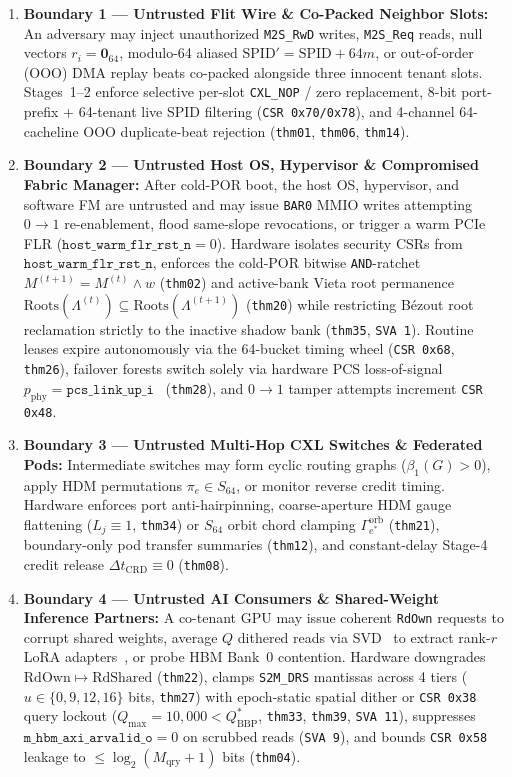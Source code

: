 \documentclass[11pt,letterpaper]{article}
\theoremstyle{spectralthm}
\begin{document}
\begin{enumerate}
  \item \textbf{Boundary 1 --- Untrusted Flit Wire \& Co-Packed Neighbor Slots:} An adversary may inject unauthorized \texttt{M2S\_RwD} writes, \texttt{M2S\_Req} reads, null vectors $r_i = \mathbf{0}_{64}$, modulo-64 aliased $\mathrm{SPID}' = \mathrm{SPID} + 64m$, or out-of-order (OOO) DMA replay beats co-packed alongside three innocent tenant slots. Stages~1--2 enforce selective per-slot \texttt{CXL\_NOP} / zero replacement, 8-bit port-prefix + 64-tenant live SPID filtering (\texttt{CSR 0x70/0x78}), and 4-channel 64-cacheline OOO duplicate-beat rejection (\texttt{thm01}, \texttt{thm06}, \texttt{thm14}).
  \item \textbf{Boundary 2 --- Untrusted Host OS, Hypervisor \& Compromised Fabric Manager:} After cold-POR boot, the host OS, hypervisor, and software FM are untrusted and may issue \texttt{BAR0} MMIO writes attempting $0 \rightarrow 1$ re-enablement, flood same-slope revocations, or trigger a warm PCIe FLR ($\texttt{host\_warm\_flr\_rst\_n} = 0$). Hardware isolates security CSRs from $\texttt{host\_warm\_flr\_rst\_n}$, enforces the cold-POR bitwise \texttt{AND}-ratchet $M^{(t+1)} = M^{(t)} \wedge w$ (\texttt{thm02}) and active-bank Vieta root permanence $\mathrm{Roots}(\Lambda^{(t)}) \subseteq \mathrm{Roots}(\Lambda^{(t+1)})$ (\texttt{thm20}) while restricting B\'{e}zout root reclamation strictly to the inactive shadow bank (\texttt{thm35}, \texttt{SVA~1\textquotesingle}). Routine leases expire autonomously via the 64-bucket timing wheel (\texttt{CSR 0x68}, \texttt{thm26}), failover forests switch solely via hardware PCS loss-of-signal $p_{\mathrm{phy}} = \texttt{pcs\_link\_up\_i}$~\cite{ucie2025spec30} (\texttt{thm28}), and $0 \rightarrow 1$ tamper attempts increment \texttt{CSR 0x48}.
  \item \textbf{Boundary 3 --- Untrusted Multi-Hop CXL Switches \& Federated Pods:} Intermediate switches may form cyclic routing graphs ($\beta_1(G) > 0$), apply HDM permutations $\pi_e \in S_{64}$, or monitor reverse credit timing. Hardware enforces port anti-hairpinning, coarse-aperture HDM gauge flattening ($L_j \equiv 1$, \texttt{thm34}) or $S_{64}$ orbit chord clamping $\Gamma_{e^*}^{\mathrm{orb}}$ (\texttt{thm21}), boundary-only pod transfer summaries (\texttt{thm12}), and constant-delay Stage-4 credit release $\Delta t_{\mathrm{CRD}} \equiv 0$ (\texttt{thm08}).
  \item \textbf{Boundary 4 --- Untrusted AI Consumers \& Shared-Weight Inference Partners:} A co-tenant GPU may issue coherent \texttt{RdOwn} requests to corrupt shared weights, average $Q$ dithered reads via SVD~\cite{carlini2024stealing} to extract rank-$r$ LoRA adapters~\cite{hu2022lora}, or probe HBM Bank~0 contention. Hardware downgrades $\mathrm{RdOwn} \mapsto \mathrm{RdShared}$ (\texttt{thm22}), clamps \texttt{S2M\_DRS} mantissas across 4 tiers ($u \in \{0,9,12,16\}$ bits, \texttt{thm27}) with epoch-static spatial dither or \texttt{CSR 0x38} query lockout ($Q_{\max} = 10,000 < Q_{\mathrm{BBP}}^*$, \texttt{thm33}, \texttt{thm39}, \texttt{SVA 11}), suppresses $\texttt{m\_hbm\_axi\_arvalid\_o} = 0$ on scrubbed reads (\texttt{SVA 9}), and bounds \texttt{CSR 0x58} leakage to $\le \log_2(M_{\mathrm{qry}}+1)$ bits (\texttt{thm04}).

\end{enumerate}
\end{document}
